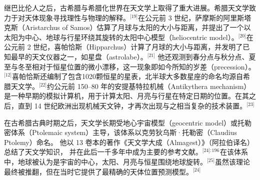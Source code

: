 继巴比伦人之后，古希腊与希腊化世界在天文学上取得了重大进展。希腊天文学致力于对天体现象寻找理性与物理的解释。\(^\text{[19]}\)在公元前 3 世纪，萨摩斯的阿里斯塔克斯（Aristarchus of Samos）估算了月球与太阳的大小与距离，并提出了一个以太阳为中心、地球与行星环绕其旋转的太阳中心模型（heliocentric model）。\(^\text{[20]}\)在公元前 2 世纪，喜帕恰斯（Hipparchus）计算了月球的大小与距离，并发明了已知最早的天文仪器之一，如星盘（astrolabe）。\(^\text{[21]}\) 他还观测到春分点与秋分点、夏至与冬至相对于恒星位置的微小漂移，这一现象即如今所知的岁差（precession）。\(^\text{[12]}\)喜帕恰斯还编制了包含1020颗恒星的星表，北半球大多数星座的命名均源自希腊天文学。\(^\text{[22]}\)约公元前 150–80 年的安提基特拉机械（Antikythera mechanism）是一种早期的模拟计算机，用于计算太阳、月亮与行星在特定日期的位置。在其之后，直到 14 世纪欧洲出现机械天文钟，才再次出现与之相当复杂的技术装置。\(^\text{[23]}\)  

在古希腊古典时期之后，天文学长期受地心宇宙模型（geocentric model）或托勒密体系（Ptolemaic system）主导，该体系以克劳狄乌斯·托勒密（Claudius Ptolemy）命名。  
他以 13 卷本的著作《天文学大成（Almagest）》（阿拉伯译名）总结了天文学知识，  
并在此后一千多年中成为主要的参考文献。\(^\text{[24]: 196 }\)在该体系中，地球被认为是宇宙的中心，太阳、月亮与恒星围绕地球旋转。\(^\text{[25]}\)虽然该理论最终被推翻，但在当时它提供了最精确的天体位置预测模型。\(^\text{[24]}\)
